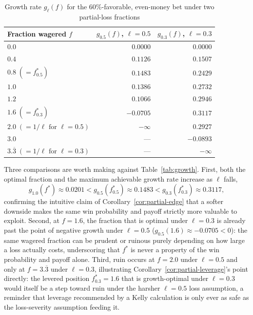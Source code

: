 \documentclass[11pt]{article}
\theoremstyle{remark}
\theoremstyle{definition}
\begin{document}
\begin{table}[htbp]
\centering
\caption{Growth rate $g_\ell(f)$ for the $60\%$-favorable, even-money bet under two partial-loss fractions}
\label{tab:partial-growth}
\begin{tabular}{@{}lrr@{}}
\toprule
Fraction wagered $f$ & $g_{0.5}(f)$, $\ell=0.5$ & $g_{0.3}(f)$, $\ell=0.3$ \\
\midrule
$0.0$ & $0.0000$ & $0.0000$ \\
$0.4$ & $0.1126$ & $0.1507$ \\
$0.8\;(=f_{0.5}^{*})$ & $0.1483$ & $0.2429$ \\
$1.0$ & $0.1386$ & $0.2732$ \\
$1.2$ & $0.1066$ & $0.2946$ \\
$1.6\;(=f_{0.3}^{*})$ & $-0.0705$ & $0.3117$ \\
$2.0\;(=1/\ell \text{ for } \ell=0.5)$ & $-\infty$ & $0.2927$ \\
$3.0$ & --- & $-0.0893$ \\
$3.\overline{3}\;(=1/\ell \text{ for } \ell=0.3)$ & --- & $-\infty$ \\
\bottomrule
\end{tabular}
\end{table}

Three comparisons are worth making against Table~\ref{tab:growth}. First, both the optimal fraction and the maximum achievable growth rate increase as $\ell$ falls,
\begin{equation*}
g_{1.0}(f^{*})\approx0.0201 < g_{0.5}(f_{0.5}^{*})\approx0.1483 < g_{0.3}(f_{0.3}^{*})\approx0.3117,
\end{equation*}
confirming the intuitive claim of Corollary~\ref{cor:partial-edge} that a softer downside makes the same win probability and payoff strictly more valuable to exploit. Second, at $f=1.6$, the fraction that is optimal under $\ell=0.3$ is already past the point of negative growth under $\ell=0.5$ ($g_{0.5}(1.6)\approx-0.0705<0$): the same wagered fraction can be prudent or ruinous purely depending on how large a loss actually costs, underscoring that $f^{*}$ is never a property of the win probability and payoff alone. Third, ruin occurs at $f=2.0$ under $\ell=0.5$ and only at $f=3.\overline{3}$ under $\ell=0.3$, illustrating Corollary~\ref{cor:partial-leverage}'s point directly: the levered position $f_{0.3}^{*}=1.6$ that is growth-optimal under $\ell=0.3$ would itself be a step toward ruin under the harsher $\ell=0.5$ loss assumption, a reminder that leverage recommended by a Kelly calculation is only ever as safe as the loss-severity assumption feeding it.
\end{document}
